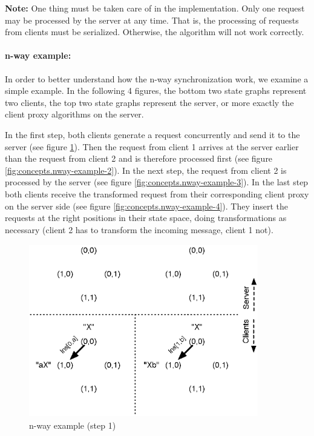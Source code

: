\textbf{Note:} One thing must be taken care of in the implementation. Only one request may be processed by the server at any time. That is, the processing of requests from clients must be serialized. Otherwise, the algorithm will not work correctly.

\paragraph{n-way example:} In order to better understand how the n-way synchronization work, we examine a simple example. In the following 4 figures, the bottom two state graphs represent two clients, the top two state graphs represent the server, or more exactly the client proxy algorithms on the server. 

In the first step, both clients generate a request concurrently and send it to the server (see figure \ref{fig:concepts.nway-example-1}). Then the request from client 1 arrives at the server earlier than the request from client 2 and is therefore processed first (see figure \ref{fig:concepts.nway-example-2}). In the next step, the request from client 2 is processed by the server (see figure \ref{fig:concepts.nway-example-3}). In the last step both clients receive the transformed request from their corresponding client proxy on the server side (see figure \ref{fig:concepts.nway-example-4}). They insert the requests at the right positions in their state space, doing transformations as necessary (client 2 has to transform the incoming message, client 1 not).

\begin{figure}[H]
 \centering
 \includegraphics[width=10.0cm,height=7.54cm]{../../images/concepts_nway-example-1.eps}
 \caption{n-way example (step 1)}
 \label{fig:concepts.nway-example-1}
\end{figure}

